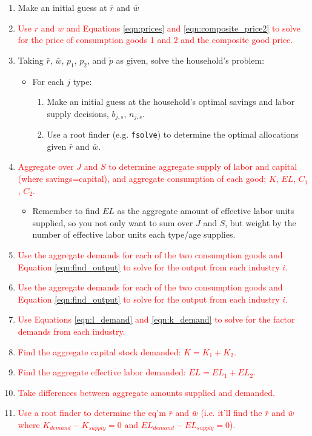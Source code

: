 \documentclass[letterpaper,12pt]{article}
\theoremstyle{definition}
\begin{document}
\begin{spacing}{1.5}
\begin{enumerate}
\item Make an initial guess at $\bar{r}$ and $\bar{w}$
\item \textcolor{red}{Use $r$ and $w$ and Equations \ref{eqn:prices} and \ref{eqn:composite_price2} to solve for the price of consumption goods 1 and 2 and the composite good price.}
\item Taking $\bar{r}$, $\bar{w}$, $p_{1}$, $p_{2}$, and $\tilde{p}$ as given, solve the household's problem:
	\begin{itemize}
	\item For each $j$ type:
		\begin{enumerate}
		\item Make an initial guess at the household's optimal savings and labor supply decisions, $b_{j,s}$, $n_{j,s}$.
		\item Use a root finder (e.g. \texttt{fsolve}) to determine the optimal allocations given $\bar{r}$ and $\bar{w}$.
		\end{enumerate}
	\end{itemize}
\item \textcolor{red}{Aggregate over $J$ and $S$ to determine aggregate supply of labor and capital (where savings=capital), and aggregate consumption of each good; $K$, $EL$, $C_{1}$, $C_{2}$.}
	\begin{itemize}
	\item Remember to find $EL$ as the aggregate amount of effective labor units supplied, so you not only want to sum over $J$ and $S$, but weight by the number of effective labor units each type/age supplies.
	\end{itemize}
\item \textcolor{red}{Use the aggregate demands for each of the two consumption goods and Equation \ref{eqn:find_output} to solve for the output from each industry $i$.}
\item \textcolor{red}{Use the aggregate demands for each of the two consumption goods and Equation \ref{eqn:find_output} to solve for the output from each industry $i$.}
\item \textcolor{red}{Use Equations \ref{eqn:l_demand} and \ref{eqn:k_demand} to solve for the factor demands from each industry.}
\item \textcolor{red}{Find the aggregate capital stock demanded: $K = K_{1}+K_{2}$.}
\item \textcolor{red}{Find the aggregate effective labor demanded: $EL = EL_{1}+EL_{2}$.}
\item \textcolor{red}{Take differences between aggregate amounts supplied and demanded.}
\item \textcolor{red}{Use a root finder to determine the eq'm $\bar{r}$ and $\bar{w}$ (i.e. it'll find the $\bar{r}$ and $\bar{w}$ where $K_{demand}-K_{supply}=0$ and $EL_{demand}-EL_{supply}=0$).}
\end{enumerate}


\end{spacing}
\end{document}
